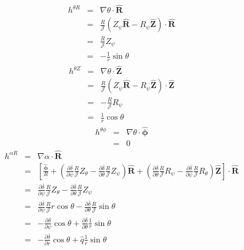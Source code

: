 \documentclass{article}
\newcommand{\tmmathbf}[1]{\ensuremath{\boldsymbol{#1}}}
\begin{document}
\begin{eqnarray*}
  h^{\theta R} & = & \nabla \theta \cdot \hat{\mathbf{R}}\\
  & = & \frac{R}{\mathcal{J}} (Z_{\psi} \hat{\mathbf{R}} - R_{\psi}
  \hat{\mathbf{Z}}) \cdot \hat{\mathbf{R}}\\
  & = & \frac{R}{\mathcal{J}} Z_{\psi}\\
  & = & - \frac{1}{r} \sin \theta
\end{eqnarray*}
\begin{eqnarray*}
  h^{\theta Z} & = & \nabla \theta \cdot \hat{\mathbf{Z}}\\
  & = & \frac{R}{\mathcal{J}} (Z_{\psi} \hat{\mathbf{R}} - R_{\psi}
  \hat{\mathbf{Z}}) \cdot \hat{\mathbf{Z}}\\
  & = & - \frac{R}{\mathcal{J}} R_{\psi}\\
  & = & \frac{1}{r} \cos \theta
\end{eqnarray*}
\begin{eqnarray*}
  h^{\theta \phi} & = & \nabla \theta \cdot \hat{\tmmathbf{\phi}}\\
  & = & 0
\end{eqnarray*}
\begin{eqnarray*}
  h^{\alpha R} & = & \nabla \alpha \cdot \hat{\mathbf{R}}\\
  & = & \left[ \frac{\hat{\tmmathbf{\phi}}}{R} + \left( \frac{\partial
  \overline{\delta}}{\partial \psi} \frac{R}{\mathcal{J}} Z_{\theta} -
  \frac{\partial \overline{\delta}}{\partial \theta} \frac{R}{\mathcal{J}}
  Z_{\psi} \right) \hat{\mathbf{R}} + \left( \frac{\partial
  \overline{\delta}}{\partial \theta} \frac{R}{\mathcal{J}} R_{\psi} -
  \frac{\partial \overline{\delta}}{\partial \psi} \frac{R}{\mathcal{J}}
  R_{\theta} \right) \hat{\mathbf{Z}} \right] \cdot \hat{\mathbf{R}}\\
  & = & \frac{\partial \overline{\delta}}{\partial \psi}
  \frac{R}{\mathcal{J}} Z_{\theta} - \frac{\partial
  \overline{\delta}}{\partial \theta} \frac{R}{\mathcal{J}} Z_{\psi}\\
  & = & \frac{\partial \overline{\delta}}{\partial \psi}
  \frac{R}{\mathcal{J}} r \cos \theta - \frac{\partial
  \overline{\delta}}{\partial \theta} \frac{R}{\mathcal{J}} \sin \theta\\
  & = & - \frac{\partial \overline{\delta}}{\partial \psi} \cos \theta +
  \frac{\partial \overline{\delta}}{\partial \theta} \frac{1}{r} \sin \theta\\
  & = & - \frac{\partial \overline{\delta}}{\partial r} \cos \theta + \hat{q}
  \frac{1}{r} \sin \theta
\end{eqnarray*}
\end{document}
